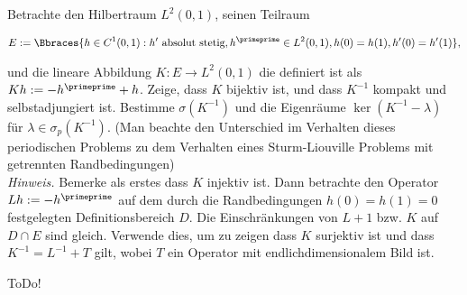 \begin{exercise}[38/1*]

Betrachte den Hilbertraum $L^2(0, 1)$, seinen Teilraum

\begin{align*}
  E
  :=
  \Bbraces
  {
    h \in C^1(0, 1):
    h^\prime ~\text{absolut stetig},
    h^\primeprime \in L^2(0, 1),
    h(0) = h(1),
    h^\prime(0) = h^\prime(1)
  },
\end{align*}

und die lineare Abbildung $K: E \to L^2(0, 1)$ die definiert ist als $K h := -h^\primeprime + h$.
Zeige, dass $K$ bijektiv ist, und dass $K^{-1}$ kompakt und selbstadjungiert ist.
Bestimme $\sigma(K^{-1})$ und die Eigenräume $\ker{(K^{-1} - \lambda)}$ für $\lambda \in \sigma_p(K^{-1})$.
(Man beachte den Unterschied im Verhalten dieses periodischen Problems zu dem Verhalten eines Sturm-Liouville Problems mit getrennten Randbedingungen) \\

\textit{Hinweis.}
Bemerke als erstes dass $K$ injektiv ist.
Dann betrachte den Operator $L h := -h^\primeprime$ auf dem durch die Randbedingungen $h(0) = h(1) = 0$ festgelegten Definitionsbereich $D$.
Die Einschränkungen von $L + 1$ bzw. $K$ auf $D \cap E$ sind gleich.
Verwende dies, um zu zeigen dass $K$ surjektiv ist und dass $K^{-1} = L^{-1} + T$ gilt, wobei $T$ ein Operator mit endlichdimensionalem Bild ist.

\end{exercise}

\begin{solution}

ToDo!

\end{solution}
